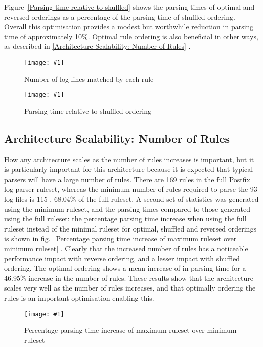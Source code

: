 \documentclass{svmult}
\newcommand{\showgraph}[3]{%
    \begin{figure}[btp]%
        \texttt{[image: \#1]}%
        \caption{#2}\label{#3}%
    \end{figure}%
}
\newcommand{\sectionref}[1]{%
    \textsection{}\vref*{#1}%
}
\newcommand{\refwithlabel}[2]{%
    #1~\vref{#2}%
}
\newcommand{\graphref}[1]{%
    \refwithlabel{fig.}{#1}%
}
\newcommand{\Graphref}[1]{%
    \refwithlabel{Figure}{#1}%
}
\newcommand{\numberOFlogFILES}[0]{%
    93%
}
\newcommand{\numberOFrules}[0]{%
    169%
}
\newcommand{\numberOFrulesMINIMUM}[0]{%
    115%
}
\newcommand{\numberOFrulesMINIMUMpercentage}[0]{%
    68.04\%%
}
\newcommand{\numberOFrulesMAXIMUMpercentage}[0]{%
    46.95\%%
}
\begin{document}
\Graphref{Parsing time relative to shuffled} shows the parsing times of
optimal and reversed orderings as a percentage of the parsing time of
shuffled ordering.  Overall this optimisation provides a modest but
worthwhile reduction in parsing time of approximately 10\%.  Optimal rule
ordering is also beneficial in other ways, as described in
\sectionref{Architecture Scalability: Number of Rules}.
\showgraph{build/graph-hits}{Number of log lines matched by each rule}{rule
hits graph} \showgraph{build/graph-optimal-and-reverse-vs-shuffle}{Parsing
time relative to shuffled ordering}{Parsing time relative to shuffled}

\subsection{Architecture Scalability: Number of Rules}

\label{Architecture Scalability: Number of Rules}

How any architecture scales as the number of rules increases is important,
but it is particularly important for this architecture because it is
expected that typical parsers will have a large number of rules.  There are
\numberOFrules{} rules in the full Postfix log parser ruleset, whereas the
minimum number of rules required to parse the \numberOFlogFILES{} log files
is \numberOFrulesMINIMUM{}, \numberOFrulesMINIMUMpercentage{} of the full
ruleset.  A second set of statistics was generated using the minimum
ruleset, and the parsing times compared to those generated using the full
ruleset: the percentage parsing time increase when using the full ruleset
instead of the minimal ruleset for optimal, shuffled and reversed orderings
is shown in \graphref{Percentage parsing time increase of maximum ruleset
over minimum ruleset}.  Clearly that the increased number of rules has a
noticeable performance impact with reverse ordering, and a lesser impact
with shuffled ordering.  The optimal ordering shows a mean increase of
 in parsing time for a
\numberOFrulesMAXIMUMpercentage{} increase in the number of rules.  These
results show that the architecture scales very well as the number of rules
increases, and that optimally ordering the rules is an important
optimisation enabling this.
\showgraph{build/graph-full-ruleset-vs-minimum-ruleset}{Percentage parsing
time increase of maximum ruleset over minimum ruleset}{Percentage parsing
time increase of maximum ruleset over minimum ruleset}
\end{document}
